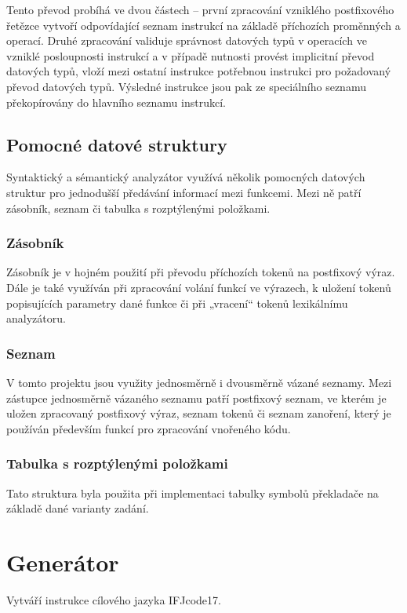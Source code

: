 \documentclass[a4paper,11pt]{article}
\begin{document}
\vspace{2mm}
Tento převod probíhá ve dvou částech – první zpracování vzniklého postfixového řetězce vytvoří odpovídající seznam instrukcí na základě příchozích proměnných a operací. Druhé zpracování validuje správnost datových typů v operacích ve vzniklé posloupnosti instrukcí a v případě nutnosti provést implicitní převod datových typů, vloží mezi ostatní instrukce potřebnou instrukci pro požadovaný převod datových typů.
Výsledné instrukce jsou pak ze speciálního seznamu překopírovány do hlavního seznamu instrukcí.

\subsection{Pomocné datové struktury} \label{syse-struktury}
Syntaktický a sémantický analyzátor využívá několik pomocných datových struktur pro jednodušší předávání informací mezi funkcemi. Mezi ně patří zásobník, seznam či tabulka s rozptýlenými položkami.

\subsubsection{Zásobník} \label{syse-struktury-zasobnik}
Zásobník je v hojném použití při převodu příchozích tokenů na postfixový výraz. Dále je také využíván při zpracování volání funkcí ve výrazech, k uložení tokenů popisujících parametry dané funkce či při „vracení“ tokenů lexikálnímu analyzátoru.

\subsubsection{Seznam} \label{syse-struktury-seznam}
V tomto projektu jsou využity jednosměrně i dvousměrně vázané seznamy. Mezi zástupce jednosměrně vázaného seznamu patří postfixový seznam, ve kterém je uložen zpracovaný postfixový výraz, seznam tokenů či seznam zanoření, který je používán především funkcí pro zpracování vnořeného kódu.

\subsubsection{Tabulka s rozptýlenými položkami} \label{syse-struktury-tabulka}
Tato struktura byla použita při implementaci tabulky symbolů překladače na základě dané varianty zadání.


\newpage
\section{Generátor} \label{gen}
Vytváří instrukce cílového jazyka IFJcode17.
\end{document}
